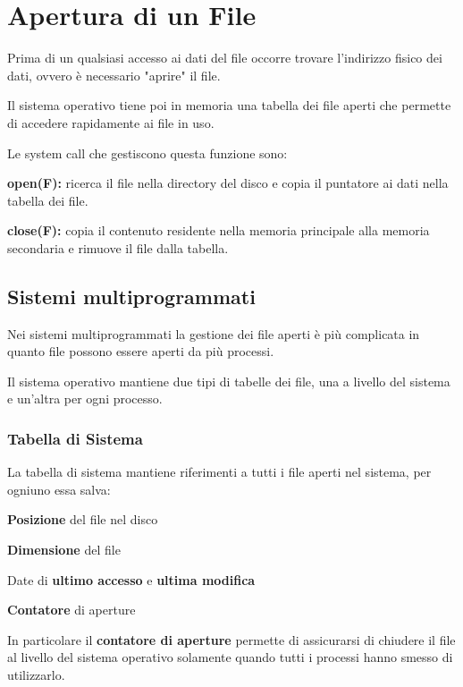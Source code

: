 \section{Apertura di un File}
Prima di un qualsiasi accesso ai dati del file occorre trovare l'indirizzo fisico dei dati, ovvero è necessario "aprire" il file.

Il sistema operativo tiene poi in memoria una tabella dei file aperti che permette di accedere rapidamente ai file in uso.

Le system call che gestiscono questa funzione sono:
\begin{sitemize}
    \item \textbf{open(F):} ricerca il file nella directory del disco e copia il puntatore ai dati nella tabella dei file.

    \item \textbf{close(F):} copia il contenuto residente nella memoria principale alla memoria secondaria e rimuove il file dalla tabella.
\end{sitemize}

\subsection{Sistemi multiprogrammati}
Nei sistemi multiprogrammati la gestione dei file aperti è più complicata in quanto file possono essere aperti da più processi.

Il sistema operativo mantiene due tipi di tabelle dei file, una a livello del sistema e un'altra per ogni processo.

\subsubsection{Tabella di Sistema}
La tabella di sistema mantiene riferimenti a tutti i file aperti nel sistema, per ogniuno essa salva:

\begin{sitemize}
    \item \textbf{Posizione} del file nel disco
    \item \textbf{Dimensione} del file
    \item Date di \textbf{ultimo accesso} e \textbf{ultima modifica}
    \item \textbf{Contatore} di aperture
\end{sitemize}

\spacer
In particolare il \textbf{contatore di aperture} permette di assicurarsi di chiudere il file al livello del sistema operativo solamente quando tutti i processi hanno smesso di utilizzarlo.

